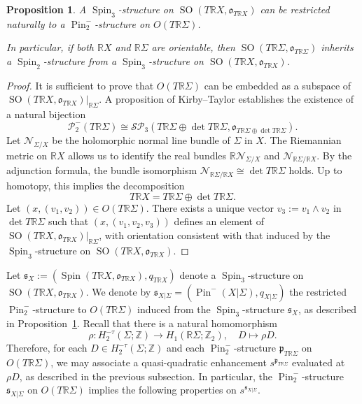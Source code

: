 \documentclass[11pt]{amsart}
\numberwithin{equation}{section}
\theoremstyle{definition}
\theoremstyle{plain}
\newtheorem{proposition}[definition]{Proposition}
\theoremstyle{remark}
\newcommand{\R}{\mathbb{R}}
\newcommand{\Z}{\mathbb{Z}}
\DeclareMathOperator{\SO}{SO}
\DeclareMathOperator{\Pin}{Pin}
\DeclareMathOperator{\Spin}{Spin}
\newcommand{\lra}{\longrightarrow}
\begin{document}
\begin{proposition}\label{Prop-Spin3.Pin2}
  A $\Spin_3$-structure on $\SO(T \R X,\mathfrak{o}_{T\R X})$ can be restricted naturally to a $\Pin^-_2$-structure on $O(T \R \Sigma)$.
 
 In particular, if both $\R X$ and $\R \Sigma$ are orientable, then $\SO(T\R \Sigma,\mathfrak{o}_{T \R \Sigma})$ inherits a $\Spin_2$-structure from a $\Spin_3$-structure on $\SO(T\R X,\mathfrak{o}_{T \R X})$.
\end{proposition}

\begin{proof}
It is sufficient to prove that $O(T\R \Sigma)$ can be embedded as a subspace of $\SO(T \R X,\mathfrak{o}_{T \R X})|_{\R \Sigma}$. A proposition of Kirby--Taylor \cite{kirby1990p} establishes the existence of a natural bijection
$$\mathcal{P}_2^-(T \R \Sigma)\cong \mathcal{SP}_3(T \R \Sigma \oplus \det T \R \Sigma,\mathfrak{o}_{T \R \Sigma \oplus \det T \R \Sigma}).$$
Let $ \mathcal{N}_{\Sigma/X}$ be the holomorphic normal line bundle of $\Sigma$ in  $X$. 
The Riemannian metric on $\R X$ allows us to identify the real bundles $\R \mathcal{N}_{\Sigma/X}$ and $ \mathcal{N}_{\R \Sigma/\R X}$.
By the adjunction formula, the bundle isomorphism  $\mathcal{N}_{\R \Sigma / \R X} \cong \det T\R \Sigma$ holds. Up to homotopy, this implies the decomposition
$$T\R X= T \R \Sigma \oplus \det T \R \Sigma.$$
Let $(x,(v_1,v_2))\in O(T\R \Sigma)$.  
There exists a unique vector $v_3 := v_1 \wedge v_2$ in $\det T \R \Sigma$ such that $(x,(v_1,v_2,v_3))$ defines an element of  $\SO(T \R X,\mathfrak{o}_{T \R X})|_{\R \Sigma}$, with  orientation consistent with that induced by the $\Spin_3$-structure on $\SO(T \R X,\mathfrak{o}_{T \R X})$.
\end{proof}


  Let $\mathfrak{s}_{X}:=(\Spin (T\mathbb{R} X,\mathfrak{o}_{T\mathbb{R} X}), q_{T \R X})$ denote a $\Spin_3$-structure on $\SO(T \R X,\mathfrak{o}_{T \R X})$.
 We denote by $\mathfrak{s}_{X|\Sigma}=(\Pin^-(X|\Sigma),q_{X|\Sigma})$ the restricted  $\Pin^-_2$-structure to $O(T \R \Sigma)$ induced from the $\Spin_3$-structure $\mathfrak{s}_{X}$, as described in Proposition~\ref{Prop-Spin3.Pin2}. Recall that there is a natural homomorphism
$$\rho\colon  H_2^{-\tau}(\Sigma;\Z) \lra H_1(\R \Sigma;\Z_2), \quad D\longmapsto \rho D.$$
 Therefore, for each $D \in H_2^{-\tau}(\Sigma;\Z)$ and each $\Pin^-_2$-structure ${\mathfrak{p}_{T\R \Sigma}}$ on $O(T \R \Sigma)$, we may associate a quasi-quadratic enhancement $s^{\mathfrak{p}_{T\R \Sigma}}$  evaluated at  $\rho D$, as described in the previous subsection. In particular, the $\Pin^-_2$-structure $\mathfrak{s}_{X|\Sigma}$ on $O(T \R \Sigma)$ implies the following properties on $s^{\mathfrak{s}_{X|\Sigma}}$.
 
\end{document}
